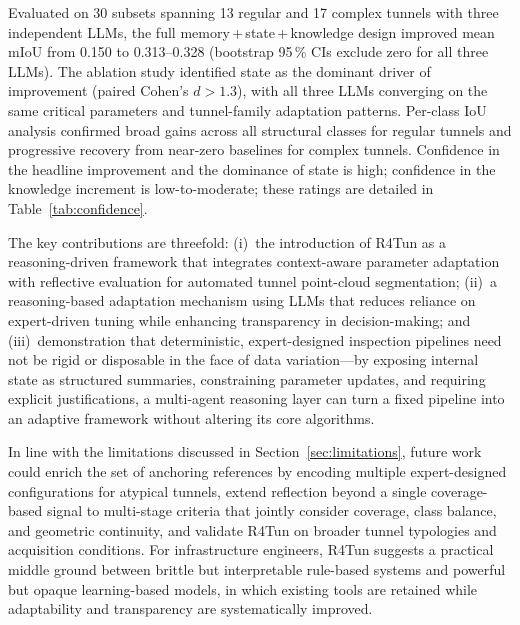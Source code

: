 \documentclass[a4paper,fleqn]{cas-dc}
\begin{document}
Evaluated on 30 subsets spanning 13 regular and 17 complex tunnels with three independent LLMs, the full memory\,+\,state\,+\,knowledge design improved mean mIoU from 0.150 to 0.313--0.328 (bootstrap 95\,\% CIs exclude zero for all three LLMs). The ablation study identified state as the dominant driver of improvement (paired Cohen's $d > 1.3$), with all three LLMs converging on the same critical parameters and tunnel-family adaptation patterns. Per-class IoU analysis confirmed broad gains across all structural classes for regular tunnels and progressive recovery from near-zero baselines for complex tunnels. Confidence in the headline improvement and the dominance of state is high; confidence in the knowledge increment is low-to-moderate; these ratings are detailed in Table~\ref{tab:confidence}.

The key contributions are threefold: (i)~the introduction of R4Tun as a reasoning-driven framework that integrates context-aware parameter adaptation with reflective evaluation for automated tunnel point-cloud segmentation; (ii)~a reasoning-based adaptation mechanism using LLMs that reduces reliance on expert-driven tuning while enhancing transparency in decision-making; and (iii)~demonstration that deterministic, expert-designed inspection pipelines need not be rigid or disposable in the face of data variation---by exposing internal state as structured summaries, constraining parameter updates, and requiring explicit justifications, a multi-agent reasoning layer can turn a fixed pipeline into an adaptive framework without altering its core algorithms.

In line with the limitations discussed in Section~\ref{sec:limitations}, future work could enrich the set of anchoring references by encoding multiple expert-designed configurations for atypical tunnels, extend reflection beyond a single coverage-based signal to multi-stage criteria that jointly consider coverage, class balance, and geometric continuity, and validate R4Tun on broader tunnel typologies and acquisition conditions. For infrastructure engineers, R4Tun suggests a practical middle ground between brittle but interpretable rule-based systems and powerful but opaque learning-based models, in which existing tools are retained while adaptability and transparency are systematically improved.

\end{document}
